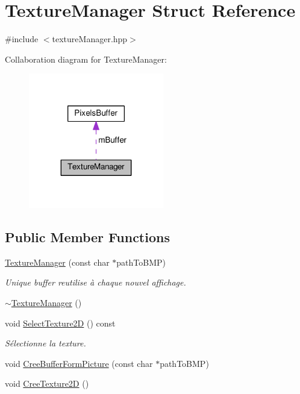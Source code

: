 \hypertarget{struct_texture_manager}{\section{Texture\+Manager Struct Reference}
\label{struct_texture_manager}
}


{\ttfamily \#include $<$texture\+Manager.\+hpp$>$}



Collaboration diagram for Texture\+Manager\+:
\nopagebreak
\begin{figure}[H]
\begin{center}
\leavevmode
\includegraphics[width=167pt]{struct_texture_manager__coll__graph}
\end{center}
\end{figure}
\subsection*{Public Member Functions}
\begin{DoxyCompactItemize}
\item 
\hyperlink{struct_texture_manager_a72275326855ba87765f4546700f15719}{Texture\+Manager} (const char $\ast$path\+To\+B\+M\+P)
\begin{DoxyCompactList}\small\item\em Unique buffer reutilise à chaque nouvel affichage. \end{DoxyCompactList}\item 
\hyperlink{struct_texture_manager_a001d6d74674961db79987e3222682576}{$\sim$\+Texture\+Manager} ()
\item 
void \hyperlink{struct_texture_manager_a90556701109bfd103c778eb33c5d8771}{Select\+Texture2\+D} () const 
\begin{DoxyCompactList}\small\item\em Sélectionne la texture. \end{DoxyCompactList}\item 
void \hyperlink{struct_texture_manager_ab70062e3dcab6052fa6699880e256d5c}{Cree\+Buffer\+Form\+Picture} (const char $\ast$path\+To\+B\+M\+P)
\item 
void \hyperlink{struct_texture_manager_ac19f768b2653d9384b54226dda403396}{Cree\+Texture2\+D} ()
\end{DoxyCompactItemize}
